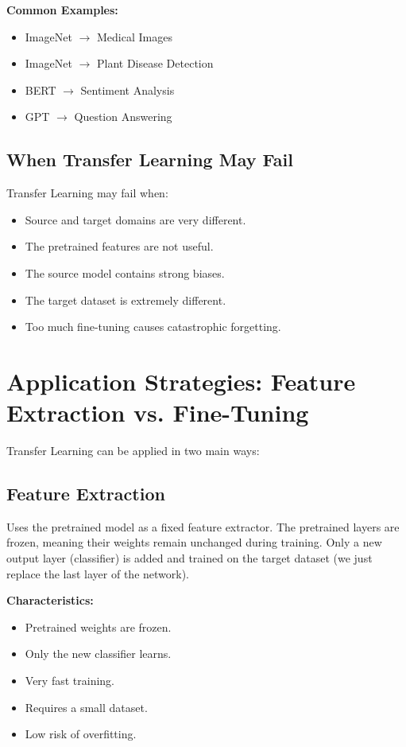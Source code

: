 \textbf{Common Examples:}
\begin{itemize}
    \item ImageNet $\to$ Medical Images
    \item ImageNet $\to$ Plant Disease Detection
    \item BERT $\to$ Sentiment Analysis
    \item GPT $\to$ Question Answering
\end{itemize}

\subsection{When Transfer Learning May Fail}
Transfer Learning may fail when:
\begin{itemize}
    \item Source and target domains are very different.
    \item The pretrained features are not useful.
    \item The source model contains strong biases.
    \item The target dataset is extremely different.
    \item Too much fine-tuning causes catastrophic forgetting.
\end{itemize}

\section{Application Strategies: Feature Extraction vs. Fine-Tuning}

Transfer Learning can be applied in two main ways:

\subsection{Feature Extraction}
Uses the pretrained model as a fixed feature extractor. The pretrained layers are frozen, meaning their weights remain unchanged during training. Only a new output layer (classifier) is added and trained on the target dataset (we just replace the last layer of the network).

\textbf{Characteristics:}
\begin{itemize}
    \item Pretrained weights are frozen.
    \item Only the new classifier learns.
    \item Very fast training.
    \item Requires a small dataset.
    \item Low risk of overfitting.
\end{itemize}

